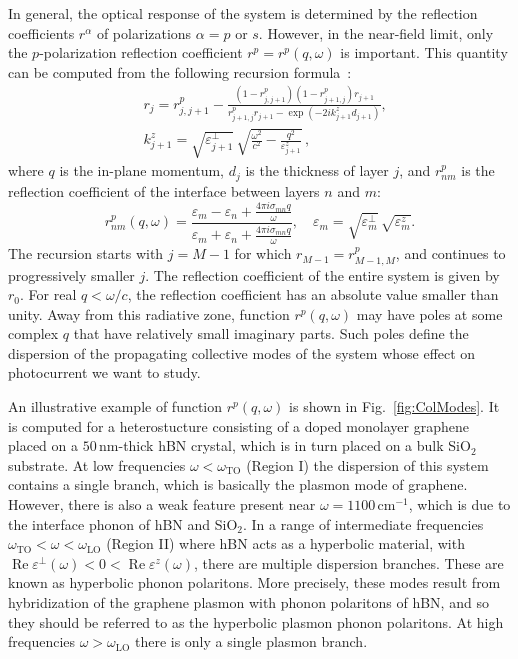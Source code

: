 \documentclass[aps, prb, reprint, superscriptaddress]{revtex4-2}
\DeclareMathOperator{\re}{Re}
\newcommand{\unit}[1]{\,\mathrm{#1}} %
\begin{document}
In general, the optical response of the system is determined by the
reflection coefficients $r^\alpha$ of polarizations $\alpha = p$ or $s$. 
However, in the near-field limit, only the
$p$-polarization reflection coefficient $r^p = r^p(q, \omega)$ is important.
This quantity can be computed from the following recursion formula~\cite{Wu2015}: 
\begin{align}
	\label{eqn:rP_recursion}
	&r_j = r^p_{j, j+1} - \frac{(1 - r^p_{j, j + 1})(1 - r^p_{j+1, j}) r_{j+1}}{r^p_{j + 1, j} r_{j + 1} - \exp(-2 i k^z_{j+1} d_{j+1})},\\
	& k^z_{j+1} = \sqrt{\varepsilon^\perp_{j+1}}\, \sqrt{\frac{\omega^2}{c^2} - \frac{q^2}{\varepsilon^z_{j+1}}}\,,
\end{align}
where $q$ is the in-plane momentum,
$d_{j}$ is the thickness of layer $j$, and $r^{p}_{n m}$ is the reflection coefficient
of the interface between layers $n$ and $m$:
\begin{equation}
	\label{eqn:rP_def_QS}
	r^{p}_{n m}(q, \omega) = \frac{\varepsilon_m - \varepsilon_n + \frac{4\pi i\sigma_{m n} q}{\omega}}{\varepsilon_m + \varepsilon_n + \frac{4\pi  i  \sigma_{m n} q}{\omega}}, \quad \varepsilon_m = \sqrt{\varepsilon_m^\perp}\, \sqrt{\varepsilon_m^z}.
\end{equation}
The recursion starts with $j = M - 1$ for which $r_{M - 1} = r^p_{M - 1, M}$, and continues to progressively smaller $j$.
The reflection coefficient of the entire system is given by $r_0$.
For real $q < \omega / c$, the reflection coefficient has an absolute value smaller than unity.
Away from this radiative zone, function $r^p(q, \omega)$ may have poles at some complex $q$ that
have relatively small imaginary parts.
Such poles define the dispersion of the propagating collective modes of the system whose effect on photocurrent we want to study.

An illustrative example of function $r^p(q, \omega)$ is shown in Fig.~\ref{fig:ColModes}.
It is computed for a heterostucture consisting of a doped monolayer graphene placed on a $50\unit{nm}$-thick hBN crystal, which is in turn placed on a bulk SiO$_2$ substrate.
At low frequencies $\omega < \omega_{\mathrm{TO}}$
(Region I) the dispersion of this system contains a single branch,
which is basically the plasmon mode of graphene.
However, there is also a weak feature present near $\omega = 1100\, \mathrm{cm}^{-1}$,
which is due to the interface phonon of hBN and SiO$_2$.
In a range of intermediate frequencies
$\omega_{\mathrm{TO}} < \omega < \omega_{\mathrm{LO}}$
(Region II) 
where hBN acts as a hyperbolic material,
with $\re\varepsilon^{\perp}(\omega) < 0 < \re\varepsilon^{z}(\omega)$, 
there are multiple dispersion branches.
These are known as hyperbolic phonon polaritons.
More precisely, 
these modes result from hybridization of the graphene plasmon with phonon polaritons of hBN, and so they should be referred to as the hyperbolic plasmon phonon polaritons.
At high frequencies $\omega > \omega_{\mathrm{LO}}$
there is only a single plasmon branch.
\end{document}
